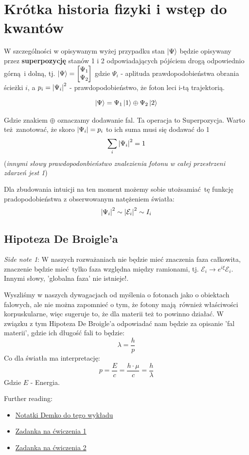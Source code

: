 \documentclass[12pt,a4paper]{report}
\newcommand{\ind}[1]{{\color{blue} #1\index{#1}}}
\newcommand{\link}[2]{{\color{cyan} \href{#1}{#2}}}
\newcommand{\E}{\mathcal{E}}
\renewcommand{\emph}{\textbf}
\newenvironment{lecture}[1]{\par\medskip
   \noindent\chapter{#1} \rmfamily}{\medskip}
\begin{document}
\begin{lecture}{Krótka historia fizyki i wstęp do kwantów}
    W szczególności w opisywanym wyżej przypadku stan $\ket{\Psi}$ będzie opisywany przez \emph{superpozycję} stanów 1 i 2 odpowiadających pójściem drogą odpowiednio górną i dolną, tj. $\ket{\Psi} = \mqty[\Psi_1 \\ \Psi_2]$ gdzie $\Psi_i$ - aplituda prawdopodobieństwa obrania ścieżki $i$, a $p_i = \qty|\Psi_i|^2$ - prawdopodobieństwo, że foton leci i-tą trajektorią.
    
    \begin{equation}
        \ket{\Psi} = \Psi_1\ket{1} \oplus \Psi_2 \ket{2}
        \label{eq:lec_1:superpozycja}
    \end{equation}
    
    Gdzie znakiem $\oplus$ oznaczamy dodawanie fal. Ta operacja to \ind{Superpozycja}. Warto też zanotować, że skoro $\qty|\Psi_i| = p_i$ to ich suma musi się dodawać do 1 
    \[
        \sum_i \qty|\Psi_i|^2 = 1
    \]
    ({\it innymi słowy prawdopodonbieństwo znalezienia fotonu w całej przestrzeni zdarzeń jest 1})
    
    Dla zbudowania intuicji na ten moment możemy sobie utożsamiać tę funkcję pradopodobieństwa z obserwowanym natężeniem światła:
    \[
        \qty|\Psi_i|^2 \sim \qty|\E_i|^2 \sim I_i
    \]
    
\section{Hipoteza De Broigle'a}
{\it Side note 1}: W naszych rozważaniach nie będzie mieć znaczenia faza całkowita, znaczenie będzie mieć tylko faza względna między ramionami, tj. $\E_i \to e^{i \xi} \E_i$. Innymi słowy, 'globalna faza' {\color{brown} nie istnieje!.}

Wyszliśmy w naszych dywagacjach od myślenia o fotonach jako o obiektach falowych, ale nie można zapomnieć o tym, że fotony mają również właściwości korpuskularne, więc sugeruje to, że dla materii też to powinno działać. W związku z tym \ind{Hipoteza De Broigle'a} odpowiadać nam będzie za opisanie 'fal materii', gdzie ich długość fali to będzie:
\[
    \lambda = \frac{h}{p}
\]
Co dla światła ma interpretację:
\[
    p = \frac{E}{c} = \frac{h \cdot \mu}{c} = \frac{h}{\lambda}
\]
Gdzie $E$ - Energia.
    
    Further reading: 
    \begin{itemize}
        \item \link{http://studenci.fuw.edu.pl/~kc427902/Prezentacje_Kwanty/wyklad1-foton.pdf}{Notatki Demko do tego wykładu}
        \item \link{http://studenci.fuw.edu.pl/~kc427902/Prezentacje_Kwanty/cwiczenia1.pdf}{Zadanka na ćwiczenia 1}
        \item \link{http://studenci.fuw.edu.pl/~kc427902/Prezentacje_Kwanty/cwiczenia1.pdf}{Zadanka na ćwiczenia 2}
    \end{itemize}
\end{lecture}
\end{document}
